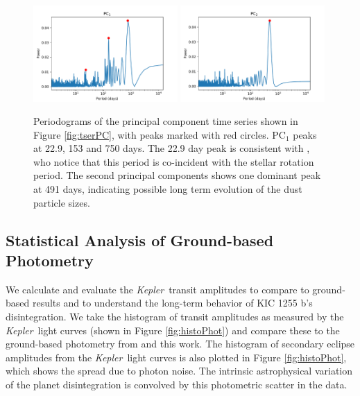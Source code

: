 \documentclass[preprint,trackchanges]{aastex61}
\newcommand{\sha}{KIC 1255 b}
\newcommand{\kepler}{{\it Kepler}}
\begin{document}
\begin{figure}[!hbtp]
\begin{centering}
\includegraphics[width=0.49\textwidth]{pc1_periodogram.pdf}
\includegraphics[width=0.49\textwidth]{pc2_periodogram.pdf}
\caption{Periodograms of the principal component time series shown in Figure \ref{fig:tserPC}, with peaks marked with red circles.
PC$_1$  peaks at 22.9, 153 and 750 days.
The 22.9 day peak is consistent with \citet{kawahara2013starspots}, who notice that this period is co-incident with the stellar rotation period.
The second principal components shows one dominant peak at 491 days,  indicating possible long term evolution of the dust particle sizes.}\label{fig:ampPeriodogram}
\end{centering}
\end{figure}



\subsection{Statistical Analysis of Ground-based Photometry}\label{sec:statistics}
We calculate and evaluate the \kepler\ transit amplitudes to compare to ground-based results and to understand the long-term behavior of \sha's disintegration.
We take the histogram of transit amplitudes as measured by the \kepler\ light curves (shown in Figure \ref{fig:histoPhot}) and compare these to the ground-based photometry from \citet{schlawin2016kic1255} and this work.
The histogram of secondary eclipse amplitudes from the \kepler\ light curves is also plotted in Figure \ref{fig:histoPhot}, which shows the spread due to photon noise.
The intrinsic astrophysical variation of the planet disintegration is convolved by this photometric scatter in the data.
\end{document}
